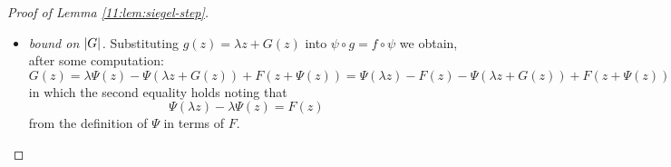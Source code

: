 \documentclass[../main.tex]{subfiles}
\begin{document}
\begin{proof}[Proof of Lemma \ref{11:lem:siegel-step}]
\begin{itemize}
\begin{itemize}
    Note first that $\psi(0) = 0$ by construction. Then by the ML-inequality we estimate
    \begin{align*}
        \abs{\frac{1}{2\pi i}\oint_\gamma \frac{\psi'(z)}{\psi(z)} dz}
        &\le \frac{1}{2\pi}
        \cdot 2\pi r (1-\eta)
        \cdot \frac{1+\eta}{r(1-2\eta)}
        &\by{since $\abs{\psi'(z)} \le 1 + \abs{\Psi'(z)} \le 1 + \eta$}
        \\
        &= \frac{1-\eta^2}{1-2\eta} < 2
    \end{align*}
    where the integral is along the boundary $\gamma = \partial \D_{r(1-\eta)}$. Then by the argument principle, $\psi$ has at most --- and hence exactly --- one root in $\D_{r(1-\eta)}$. Furthermore, for any $y \in \D_{r(1-2\eta)}$, for $z$ on the boundary of $\D_{r(1-\eta)}$ we have
    \[
    \abs{(\psi(z)-y) - \psi(z)} = \abs{y} < r(1-2\eta) \le \abs{\psi(z)}
    \]
    and so by the Rouché's theorem applied to $\psi(z)-y$ and $\psi(z)$ on $\D_{r(1-2\eta)}$ we obtain the desired conclusion that $\psi(z) - y$ has exactly one root in $\D_{r(1-\eta)}$.
    \end{itemize}
    
    Together we have that the maps in the following diagram are well-defined, and that the diagram commutes:
    \[
        \begin{tikzcd}
        \D_{r(1-3\eta)} \ar[r, "f"] &[6em] \D_{r(1-2\eta)} \ar[d, "\psi\inv"]\\
        \D_{r(1-4\eta)} \ar[r, "g = \psi \inv \circ f \circ \psi"']
        \ar[u, "\psi"] & \D_{r(1-\eta)}
        \end{tikzcd}
    \]
    thus we may define $g(z) = \psi \inv \circ f \circ \psi(z) = \lambda z + G(z)$ on $\D_{r(1-4\eta)}$ (that the first term of the series expansion of $g$ at the origin is $\lambda z$ follows from the chain rule.) %
    
    \item \emph{bound on $\left|G\right|$.} Substituting $g(z) = \lambda z + G(z)$ into $\psi \circ g = f \circ \psi$ we obtain, after some computation:
    \[
    G(z) = \lambda \Psi(z) - \Psi(\lambda z + G(z)) + F(z + \Psi(z))
    = \Psi(\lambda z) - F(z) - \Psi(\lambda z + G(z)) + F(z + \Psi(z))
    \]
    in which the second equality holds noting that
    \[
    \Psi(\lambda z) - \lambda\Psi(z) = F(z)
    \]
    from the definition of $\Psi$ in terms of $F$.
    

\end{itemize}
\end{proof}
\end{document}
